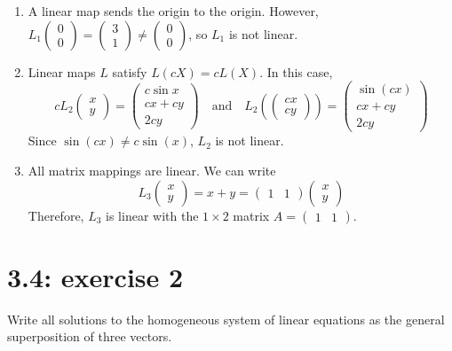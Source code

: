 \documentclass{report}
\begin{document}
\begin{enumerate}
\item A linear map sends the origin to the origin. However, $L_1 \begin{pmatrix} 0 \\ 0 \end{pmatrix} = \begin{pmatrix} 3 \\ 1 \end{pmatrix} \neq \begin{pmatrix} 0 \\ 0 \end{pmatrix}$, so $L_1$ is not linear.

\item Linear maps $L$ satisfy $L(cX) = cL(X)$. In this case,
\[
cL_2 \begin{pmatrix} x \\ y \end{pmatrix} = \begin{pmatrix} c\sin x \\ cx + cy \\ 2cy \end{pmatrix} \quad \text{and} \quad
L_2 \left( \begin{pmatrix} cx \\ cy \end{pmatrix} \right) = \begin{pmatrix} \sin (cx) \\ cx + cy \\ 2cy \end{pmatrix}
\]
Since $\sin(cx) \neq c\sin(x)$, $L_2$ is not linear.

\item All matrix mappings are linear. We can write
\[
L_3 \begin{pmatrix} x \\ y \end{pmatrix} = x + y = \begin{pmatrix} 1 & 1 \end{pmatrix} \begin{pmatrix} x \\ y \end{pmatrix}
\]
Therefore, $L_3$ is linear with the $1 \times 2$ matrix $A = \begin{pmatrix} 1 & 1 \end{pmatrix}$.
\end{enumerate}



\section*{3.4: exercise 2} 
Write all solutions to the homogeneous system of linear
equations as the general superposition of three vectors.
\end{document}
